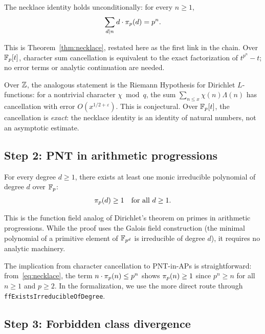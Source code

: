 \begin{theorem}\label{thm:char-cancel}
The necklace identity holds unconditionally: for every $n \geq 1$,
\[
  \sum_{d \mid n} d \cdot \pi_p(d) = p^n.
\]
\end{theorem}

This is Theorem~\ref{thm:necklace}, restated here as the first link in the
chain. Over $\mathbb{F}_p[t]$, character sum cancellation is equivalent to the exact
factorization of $t^{p^n} - t$; no error terms or analytic continuation are
needed.

\begin{remark}
Over $\mathbb{Z}$, the analogous statement is the Riemann Hypothesis for Dirichlet
$L$-functions: for a nontrivial character $\chi \bmod q$, the sum
$\sum_{n \leq x} \chi(n) \Lambda(n)$ has cancellation with error
$O(x^{1/2 + \varepsilon})$. This is conjectural. Over $\mathbb{F}_p[t]$, the cancellation
is \emph{exact}: the necklace identity is an identity of natural numbers, not
an asymptotic estimate.
\end{remark}

\subsection{Step 2: PNT in arithmetic progressions}

\begin{theorem}\label{thm:pnt}
For every degree $d \geq 1$, there exists at least one monic irreducible
polynomial of degree $d$ over $\mathbb{F}_p$:
\[
  \pi_p(d) \geq 1 \quad \text{for all } d \geq 1.
\]
\end{theorem}

This is the function field analog of Dirichlet's theorem on primes in
arithmetic progressions. While the proof uses the Galois field construction
(the minimal polynomial of a primitive element of $\mathbb{F}_{p^{d}}$ is irreducible
of degree $d$), it requires no analytic machinery.

The implication from character cancellation to PNT-in-APs is
straightforward: from~\eqref{eq:necklace}, the term $n \cdot \pi_p(n)
\leq p^n$ shows $\pi_p(n) \geq 1$ since $p^n \geq n$ for all $n \geq 1$
and $p \geq 2$. In the formalization, we use the more direct route through
\texttt{ffExistsIrreducibleOfDegree}.


\subsection{Step 3: Forbidden class divergence}

